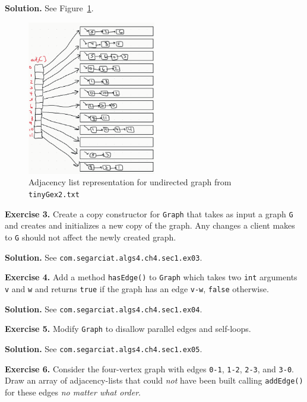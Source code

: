 \documentclass[12pt, a4paper]{article}
\newenvironment{ex}[2][Exercise]
{\par\medskip\noindent \textbf{#1 #2.}}
{\medskip}
\newenvironment{sol}[1][Solution]
{\par\medskip\noindent \textbf{#1.} }
{\medskip}
\begin{document}
	\begin{sol}
		See Figure~\ref{fig:ex-02}.
		\begin{figure}
			\centering
			\includegraphics[width=0.5\textwidth]{exercise-02}
			\caption{Adjacency list representation for undirected graph from \texttt{tinyGex2.txt}}
			\label{fig:ex-02}
		\end{figure}
	\end{sol}
	\begin{ex}{3}
		Create a copy constructor for \texttt{Graph} that takes as input a graph
		\texttt{G} and creates and initializes a new copy of the graph. Any changes
		a client makes to \texttt{G} should not affect the newly created graph.
	\end{ex}
	\begin{sol}
		See \texttt{com.segarciat.algs4.ch4.sec1.ex03}.
	\end{sol}
	\begin{ex}{4}
		Add a method \texttt{hasEdge()} to \texttt{Graph} which takes two \texttt{int}
		arguments \texttt{v} and \texttt{w} and returns \texttt{true} if the graph has
		an edge \texttt{v-w}, \texttt{false} otherwise.
	\end{ex}
	\begin{sol}
		See \texttt{com.segarciat.algs4.ch4.sec1.ex04}.
	\end{sol}
	\begin{ex}{5}
		Modify \texttt{Graph} to disallow parallel edges and self-loops.
	\end{ex}
	\begin{sol}
		See \texttt{com.segarciat.algs4.ch4.sec1.ex05}.
	\end{sol}
	\begin{ex}{6}
		Consider the four-vertex graph with edges \texttt{0-1}, \texttt{1-2}, \texttt{2-3},
		and \texttt{3-0}. Draw an array of adjacency-lists that could \emph{not} have been
		built calling \texttt{addEdge()} for these edges \emph{no matter what order}.
	\end{ex}
\end{document}
